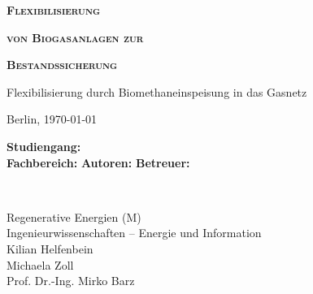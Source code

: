\begin{titlepage}
	\begin{center}
		
		\vspace*{1cm}
		
		\textbf{\textsc{{\huge Flexibilisierung}}}
		
		\vspace{0.3cm}

		\textbf{\textsc{{\huge von Biogasanlagen zur}}}
		
		\vspace{0.3cm}

		\textbf{\textsc{{\huge Bestandssicherung}}}
 
		\vspace{0.5cm}

		{\Large Flexibilisierung durch Biomethaneinspeisung in das Gasnetz}
 
		\vspace{2cm}
		
		Berlin, \today
       
       
 
		\vfill
 
		\vspace{0.8cm}
 
		\begin{minipage}{0.4\textwidth}
			\begin{flushleft}
				\textbf{Studiengang:}\\
				\textbf{Fachbereich:}\newline\newline
				\textbf{Autoren:}\newline\newline
				\textbf{Betreuer:}\\
			\end{flushleft}
		\end{minipage}~
		\begin{minipage}{0.4\textwidth}            
			\begin{flushright}
				Regenerative Energien (M)\\
				Ingenieurwissenschaften – Energie und Information\\
				Kilian Helfenbein\\
				Michaela Zoll\\
				Prof. Dr.-Ing. Mirko Barz\\
			\end{flushright}        
		\end{minipage}\\[2 cm]
		
	\end{center}
\end{titlepage}